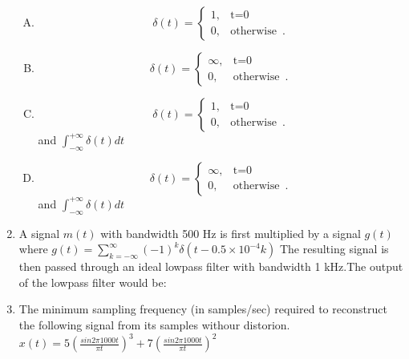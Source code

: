 \documentclass[journal,12pt,twocolumn]{IEEEtran}
\begin{document}
\begin{enumerate}[1.]
\begin{enumerate}[(A)]
\item \[
	\delta(t)=\begin{cases}
		1, & \text{t=0}  \\
		0, & \text{otherwise }\,.
	\end{cases}
\]
\item \[
	\delta(t)=\begin{cases}
		\infty, & \text{t=0}  \\
		0, & \text{otherwise }\,.
	\end{cases}
\]
\item \[
	\delta(t)=\begin{cases}
		1, & \text{t=0}  \\
		0, & \text{otherwise }\,.
	\end{cases}
\] and \hspace{3mm}$\int_{-\infty}^{+\infty} \delta(t) dt$
\item \[
	\delta(t)=\begin{cases}
		\infty, & \text{t=0}  \\
		0, & \text{otherwise }\,.
	\end{cases}
\] and \hspace{3mm} $\int_{-\infty}^{+\infty} \delta(t) dt$


\end{enumerate}

\item A signal $m(t)$ with bandwidth 500 Hz is first multiplied by a signal $g(t)$ where $g(t)=\sum_{k=-\infty}^{\infty}(-1)^{k}\delta(t-0.5\times 10^{-4}k)$ \newline The resulting signal is then passed through an ideal lowpass filter with bandwidth 1 kHz.The output of the lowpass filter would be:
\begin{enumerate}[(A)]
\end{enumerate}

\item The minimum sampling frequency (in samples/sec) required to reconstruct the following signal from its samples withour distorion. \newline $x(t)=5(\frac{sin 2\pi 1000 t}{\pi t})^{3}+7(\frac{sin 2\pi 1000 t}{\pi t})^{2}$\\
\begin{enumerate}[(A)]
\begin{multicols}{2}
\setlength\itemsep{1em}


\end{multicols}
\end{enumerate}
\end{enumerate}
\end{document}
